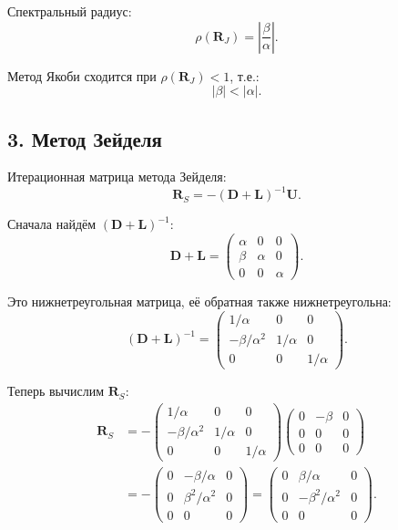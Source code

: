 \documentclass{article}
\begin{document}
Спектральный радиус:
\begin{equation}
\rho(\mathbf{R}_J) = \left|\frac{\beta}{\alpha}\right|.
\end{equation}

Метод Якоби сходится при $\rho(\mathbf{R}_J) < 1$, т.е.:
\begin{equation}
\boxed{|\beta| < |\alpha|.}
\end{equation}

\subsection*{3. Метод Зейделя}

Итерационная матрица метода Зейделя:
\begin{equation}
\mathbf{R}_S = -(\mathbf{D} + \mathbf{L})^{-1} \mathbf{U}.
\end{equation}

Сначала найдём $(\mathbf{D} + \mathbf{L})^{-1}$:
\begin{equation}
\mathbf{D} + \mathbf{L} = \begin{pmatrix} \alpha & 0 & 0 \\ \beta & \alpha & 0 \\ 0 & 0 & \alpha \end{pmatrix}.
\end{equation}

Это нижнетреугольная матрица, её обратная также нижнетреугольна:
\begin{equation}
(\mathbf{D} + \mathbf{L})^{-1} = \begin{pmatrix} 1/\alpha & 0 & 0 \\ -\beta/\alpha^2 & 1/\alpha & 0 \\ 0 & 0 & 1/\alpha \end{pmatrix}.
\end{equation}

Теперь вычислим $\mathbf{R}_S$:
\begin{align}
\mathbf{R}_S &= -\begin{pmatrix} 1/\alpha & 0 & 0 \\ -\beta/\alpha^2 & 1/\alpha & 0 \\ 0 & 0 & 1/\alpha \end{pmatrix} \begin{pmatrix} 0 & -\beta & 0 \\ 0 & 0 & 0 \\ 0 & 0 & 0 \end{pmatrix} \nonumber \\
&= -\begin{pmatrix} 0 & -\beta/\alpha & 0 \\ 0 & \beta^2/\alpha^2 & 0 \\ 0 & 0 & 0 \end{pmatrix} = \begin{pmatrix} 0 & \beta/\alpha & 0 \\ 0 & -\beta^2/\alpha^2 & 0 \\ 0 & 0 & 0 \end{pmatrix}.
\end{align}
\end{document}
